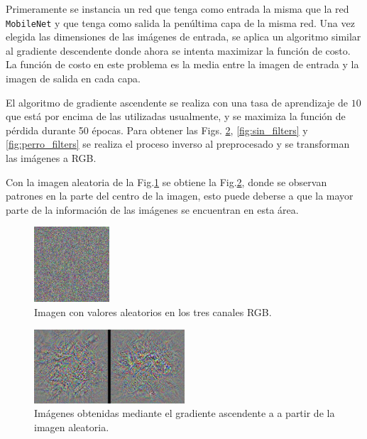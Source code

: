 Primeramente se instancia un red que tenga como entrada la misma que la red \verb|MobileNet| y que tenga como salida la penúltima capa de la misma red. Una vez elegida las dimensiones de las imágenes de entrada, se aplica un algoritmo similar al gradiente descendente donde ahora se intenta maximizar la función de costo. La función de costo en este problema es la media entre la imagen de entrada y la imagen de salida en cada capa.

El algoritmo de gradiente ascendente se realiza con una tasa de aprendizaje de $10$ que está por encima de las utilizadas usualmente, y se maximiza la función de pérdida durante 50 épocas. Para obtener las Figs. \ref{fig:random_filters}, \ref{fig:sin_filters} y \ref{fig:perro_filters} se realiza el proceso inverso al preprocesado y se transforman las imágenes a RGB.

Con la imagen  aleatoria de la Fig.\ref{fig:random_init} se obtiene la Fig.\ref{fig:random_filters}, donde se observan  patrones en la parte del centro de la imagen, esto puede deberse a que la mayor parte de la información de las imágenes se encuentran en esta área. 

\begin{figure}[H]
    \begin{small}
        \begin{center}
            \includegraphics[width=0.25\textwidth]{Figs/random_init_img_epochs_50.pdf}
        \end{center}
        \caption{Imagen con valores aleatorios en los tres canales RGB.}
        \label{fig:random_init}
    \end{small}
\end{figure}


\begin{figure}[H]
    \begin{small}
        \begin{center}
            \includegraphics[width=0.5\textwidth]{Figs/random_filters_epochs_50.pdf}
        \end{center}
        \caption{Imágenes obtenidas mediante el gradiente ascendente a a partir de la imagen aleatoria.}
        \label{fig:random_filters}
    \end{small}
\end{figure}

